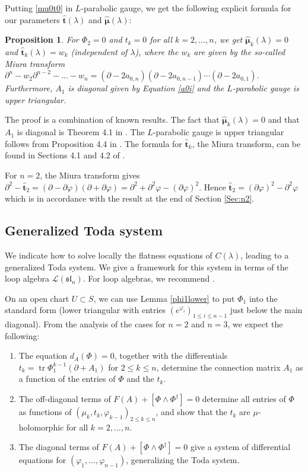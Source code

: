 \documentclass[11pt]{amsart}
\newtheorem{prop}[thm]{Proposition}
\numberwithin{thm}{section} %
\numberwithin{equation}{section} %
\numberwithin{figure}{section} %
\renewcommand*{\l}{\lambda}
\newcommand*{\del}{\partial}
\DeclareMathOperator{\tr}{tr}
\begin{document}
Putting \eqref{mu0t0} in $L$-parabolic gauge, we get the following explicit formula for our parameters $\bm\hat{t}(\l)$ and $\bm\hat{\mu}(\l)$:
\begin{prop}
For $\Phi_2=0$ and $t_k=0$ for all $k=2,...,n$, we get $\bm\hat{\mu}_k(\l)=0$ and $\bm\hat{t}_k(\l)=w_k$ (independent of $\lambda$), where the $w_k$ are given by the so-called \emph{Miura transform} $\del^n-w_2\del^{n-2}-...-w_n = (\partial-2a_{0,n})(\partial-2a_{0,n-1})\cdots(\partial-2a_{0,1})$. Furthermore, $A_1$ is diagonal given by Equation \eqref{a0i} and the $L$-parabolic gauge is upper triangular.
\end{prop}

The proof is a combination of known results. The fact that $\bm\hat{\mu}_k(\l)=0$ and that $A_1$ is diagonal is Theorem 4.1 in \cite{AF}. The $L$-parabolic gauge is upper triangular follows from Proposition 4.4 in \cite{AF}. The formula for $\bm\hat{t}_k$, the Miura transform, can be found in Sections 4.1 and 4.2 of \cite{Bonora}.

For $n=2$, the Miura transform gives $\partial^2-\bm\hat{t}_2=(\partial-\partial\varphi)(\partial+\partial\varphi)=\partial^2+\partial^2\varphi-(\partial\varphi)^2$. Hence $\bm\hat{t}_2 = (\partial\varphi)^2-\partial^2\varphi$ which is in accordance with the result at the end of Section \ref{Sec:n2}.


\subsection{Generalized Toda system}

We indicate how to solve locally the flatness equations of $C(\l)$, leading to a generalized Toda system. We give a framework for this system in terms of the loop algebra $\mathcal{L}(\mathfrak{sl}_n)$. For loop algebras, we recommend \cite{Khesin-Wendt}.

On an open chart $U\subset S$, we can use Lemma \ref{phi1lower} to put $\Phi_1$ into the standard form (lower triangular with entries $(e^{\varphi_i})_{1\leq i\leq n-1}$ just below the main diagonal). From the analysis of the cases for $n=2$ and $n=3$, we expect the following:
\begin{enumerate}
    \item The equation $d_A(\Phi)=0$, together with the differentials $t_k=\tr \Phi_1^{k-1}(\partial+A_1)$ for $2\leq k\leq n$, determine the connection matrix $A_1$ as a function of the entries of $\Phi$ and the $t_k$.
    \item The off-diagonal terms of $F(A)+[\Phi\wedge\Phi^\dagger]=0$ determine all entries of $\Phi$ as functions of $(\mu_k,t_k,\varphi_{k-1})_{2\leq k\leq n}$, and show that the $t_k$ are $\mu$-holomorphic for all $k=2,...,n$.
    \item The diagonal terms of $F(A)+[\Phi\wedge\Phi^\dagger]=0$ give a system of differential equations for $(\varphi_1,...,\varphi_{n-1})$, generalizing the Toda system.
\end{enumerate}
\end{document}
